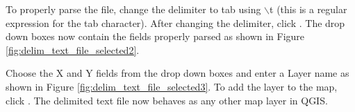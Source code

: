 To properly parse the file, change the delimiter to tab using \mbox{$\backslash$}t (this is a regular expression for the tab character).
After changing the delimiter, click .
The drop down boxes now contain the fields properly parsed as shown in Figure \ref{fig:delim_text_file_selected2}.


Choose the X and Y fields from the drop down boxes and enter a Layer name as shown in Figure \ref{fig:delim_text_file_selected3}.
To add the layer to the map, click .
The delimited text file now behaves as any other map layer in QGIS.